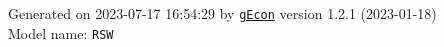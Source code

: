 \documentclass[10pt,a4paper]{article}
\numberwithin{equation}{section}
\begin{document}
\begin{landscape}
\begin{flushleft}{\large
Generated  on 2023-07-17 16:54:29 by \href{http://gecon.r-forge.r-project.org/}{\texttt{gEcon}} version 1.2.1 (2023-01-18)\\
Model name: \verb+RSW+
}\end{flushleft}


\end{landscape}

\end{document}
